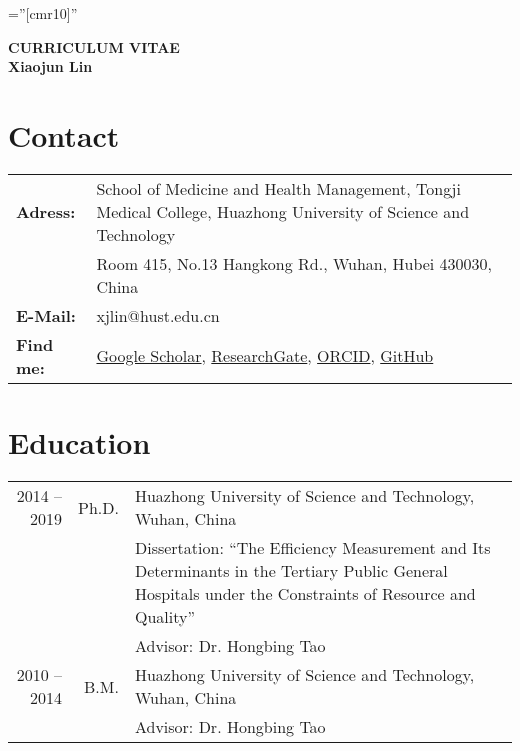\documentclass[a4paper,10pt]{article}
\begin{document}
\pagestyle{myheadings}

\font\fb=''[cmr10]'' %

\par{\centering
		{\LARGE \textbf{CURRICULUM VITAE}  \\[10pt]		
		\Large \textbf{Xiaojun Lin} \\
	}\bigskip\par}
	
\thispagestyle{empty} %
 
\section{Contact}
\begin{tabular}{l p{11.5cm}}
\textbf{Adress: } & School of Medicine and Health Management, Tongji Medical College, Huazhong University of Science and Technology\\ 
 				  & Room 415, No.13 Hangkong Rd., Wuhan, Hubei 430030, China\\
\textbf{E-Mail: } & xjlin@hust.edu.cn\\
\textbf{Find me: } &
		\href{https://scholar.google.com/citations?user=ZBGYTowAAAAJ&hl=zh-CN}{Google Scholar}, 
		\href{https://www.researchgate.net/profile/Xiaojun_Lin2}{ResearchGate},		
		\href{https://orcid.org/0000-0003-4284-2401}{ORCID}, 
		\href{https://github.com/xiaojunlin}{GitHub}
\end{tabular}

\section{Education}
\begin{tabular}{rr p{11cm}}
 2014 -- 2019 & Ph.D. & Huazhong University of Science and Technology, Wuhan, China \\
&& \small Dissertation: ``The Efficiency Measurement and Its Determinants in the Tertiary Public General Hospitals under the Constraints of Resource and Quality''\\
&& \small Advisor: Dr. Hongbing Tao\\
 2010 -- 2014 & B.M. & Huazhong University of Science and Technology, Wuhan, China\\
&& \small Advisor: Dr. Hongbing Tao\\
\end{tabular}
\end{document}
